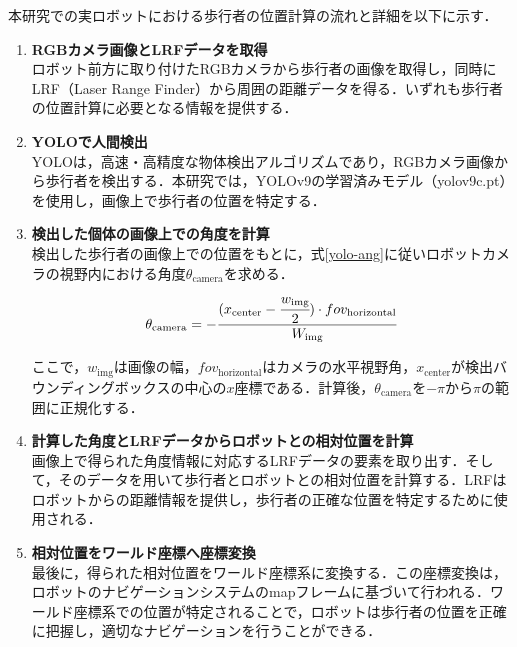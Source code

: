 \newpage

本研究での実ロボットにおける歩行者の位置計算の流れと詳細を以下に示す．

\begin{enumerate}
  \item \textbf{RGBカメラ画像とLRFデータを取得} \\
  ロボット前方に取り付けたRGBカメラから歩行者の画像を取得し，同時にLRF（Laser Range Finder）から周囲の距離データを得る．いずれも歩行者の位置計算に必要となる情報を提供する．

  \item \textbf{YOLOで人間検出} \\
  YOLO\cite{redmon2016you-yolo}は，高速・高精度な物体検出アルゴリズムであり，RGBカメラ画像から歩行者を検出する．本研究では，YOLOv9\cite{wang2025yolov9}の学習済みモデル（yolov9c.pt）を使用し，画像上で歩行者の位置を特定する．

  \item \textbf{検出した個体の画像上での角度を計算} \\
  検出した歩行者の画像上での位置をもとに，式\eqref{yolo-ang}に従いロボットカメラの視野内における角度$\theta_{\text{camera}}$を求める．
  \begin{equation}
    \theta_{\text{camera}} = - \cfrac{(x_{\text{center}} - \cfrac{w_{\text{img}}}{2}) \cdot fov_{\text{horizontal}}}{W_{\text{img}}} \label{yolo-ang}
  \end{equation}

  ここで，$w_{\text{img}}$は画像の幅，$fov_{\text{horizontal}}$はカメラの水平視野角，$x_{\text{center}}$が検出バウンディングボックスの中心の$x$座標である．計算後，$\theta_{\text{camera}}$を$-\pi \text{から} \pi$の範囲に正規化する．

  \item \textbf{計算した角度とLRFデータからロボットとの相対位置を計算} \\
  画像上で得られた角度情報に対応するLRFデータの要素を取り出す．そして，そのデータを用いて歩行者とロボットとの相対位置を計算する．LRFはロボットからの距離情報を提供し，歩行者の正確な位置を特定するために使用される．

  \item \textbf{相対位置をワールド座標へ座標変換} \\
  最後に，得られた相対位置をワールド座標系に変換する．この座標変換は，ロボットのナビゲーションシステムのmapフレームに基づいて行われる．ワールド座標系での位置が特定されることで，ロボットは歩行者の位置を正確に把握し，適切なナビゲーションを行うことができる．
\end{enumerate}

